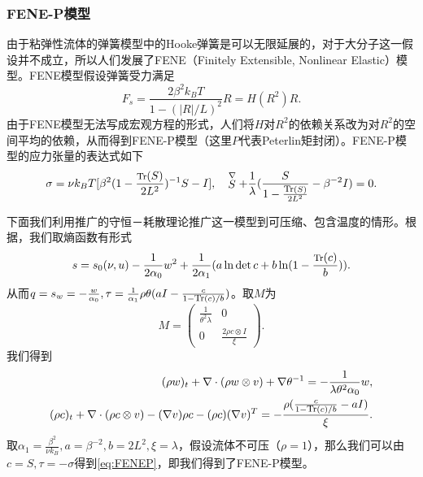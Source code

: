 	\subsubsection{FENE-P模型}
	由于粘弹性流体的弹簧模型中的Hooke弹簧是可以无限延展的，对于大分子这一假设并不成立，所以人们发展了FENE（Finitely Extensible, Nonlinear Elastic）模型。FENE模型假设弹簧受力满足
	\begin{equation*}
		F_s = \frac{2 \beta^2 k_B T}{1-(|R|/L)^2} R = H(R^2)R.
	\end{equation*}
	由于FENE模型无法写成宏观方程的形式\cite{le2009multiscale}，人们将$H$对$R^2$的依赖关系改为对$R^2$的空间平均的依赖，从而得到FENE-P模型（这里$P$代表Peterlin矩封闭\cite{larson1999structure,le2009multiscale,masmoudi2011global}）。FENE-P模型的应力张量的表达式如下\cite{larson1999structure}
	\begin{equation} \label{eq:FENEP}
		\sigma = \nu k_B T [ \beta^2 (1- \frac{\text{\footnotesize $\mbox{Tr}$}(S)}{2L^2})^{-1}S - I],  \quad \stackrel{\nabla} S + \frac{1}{\lambda} (\frac{S}{1-\frac{\text{\footnotesize $\mbox{Tr}$}(S)}{2L^2}} - \beta^{-2}I) = 0. 
	\end{equation}

	下面我们利用推广的守恒－耗散理论推广这一模型到可压缩、包含温度的情形。根据\cite{masmoudi2011global,hu2007new}，我们取熵函数有形式
	\begin{equation*}
		s = s_0(\nu,u)  - \frac{1}{2  \alpha_0} w^2 + \frac{1}{2 \alpha_1} (a \ln \det c + b \ln(1-\frac{\text{\footnotesize $\mbox{Tr}$} (c)}{b})).
	\end{equation*}
	从而$q=s_w=-\frac{ w}{\alpha_0},\tau = \frac{1}{\alpha_1} \rho \theta (a I-\frac{c}{1-{\text{\footnotesize $\mbox{Tr}$} (c)}/{b}})$。取$M$为
	\begin{equation*}
		M = \left( \begin{array}{ccc} 
			\frac{1}{\theta^2 \lambda} & 0 \\
			0 &  \frac{2 \rho  c \otimes I}{\xi}   
		\end{array} \right).
	\end{equation*}
	我们得到
	\begin{subequations}\label{eq:generalizedFENEP}
		\begin{align}
			(\rho w)_t + \nabla \cdot (\rho w \otimes v) + \nabla \theta^{-1} = -\frac{1}{\lambda \theta^2 \alpha_0} w, \\
			(\rho c)_t +  \nabla \cdot (\rho c \otimes v) - (\nabla v) \rho c - (\rho c) (\nabla v)^T  = -\frac{\rho (\frac{c}{1-	{\text{\footnotesize $\mbox{Tr}$}(c)}/{b}}-a I) }{\xi}.
		\end{align}
	\end{subequations}
	取$\alpha_1 = \frac{\beta^2}{\nu k_B},a=\beta^{-2},b=2L^2,\xi = \lambda$，假设流体不可压（$\rho=1$），那么我们可以由$c=S,\tau = -\sigma$得到\eqref{eq:FENEP}，即我们得到了FENE-P模型。

